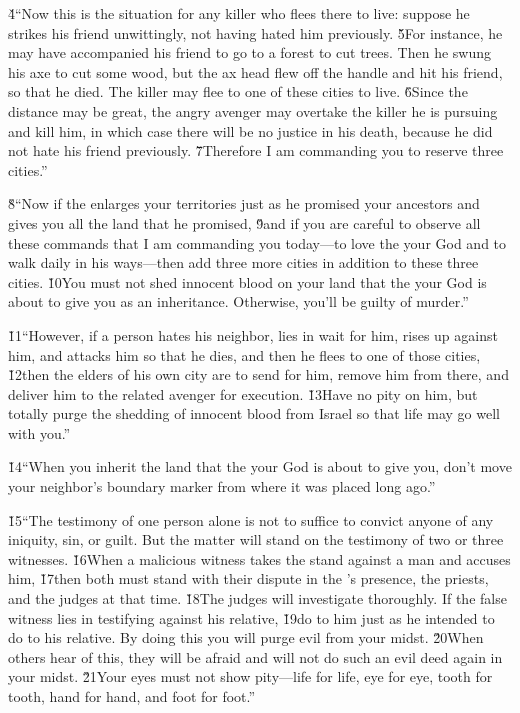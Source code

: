 \v{4}``Now this is the situation for any killer who flees there to live: suppose he strikes his friend unwittingly, not having hated him previously. \v{5}For instance, he may have accompanied his friend to go to a forest to cut trees. Then he swung his axe to cut some wood, but the ax head flew off the handle and hit his friend, so that he died. The killer may flee to one of these cities to live. \v{6}Since the distance may be great, the angry avenger may overtake the killer he is pursuing and kill him, in which case there will be no justice in his death, because he did not hate his friend previously. \v{7}Therefore I am commanding you to reserve three cities.''

\v{8}``Now if the  enlarges your territories just as he promised your ancestors and gives you all the land that he promised, \v{9}and if you are careful to observe all these commands that I am commanding you today---to love the  your God and to walk daily in his ways---then add three more cities in addition to these three cities. \v{10}You must not shed innocent blood on your land that the  your God is about to give you as an inheritance. Otherwise, you'll be guilty of murder.''

\v{11}``However, if a person hates his neighbor, lies in wait for him, rises up against him, and attacks him so that he dies, and then he flees to one of those cities, \v{12}then the elders of his own city are to send for him, remove him from there, and deliver him to the related avenger for execution. \v{13}Have no pity on him, but totally purge the shedding of innocent blood from Israel so that life may go well with you.''

\v{14}``When you inherit the land that the  your God is about to give you, don't move your neighbor's boundary marker from where it was placed long ago.''

\v{15}``The testimony of one person alone is not to suffice to convict anyone of any iniquity, sin, or guilt. But the matter will stand on the testimony of two or three witnesses. \v{16}When a malicious witness takes the stand against a man and accuses him, \v{17}then both must stand with their dispute in the 's presence, the priests, and the judges at that time. \v{18}The judges will investigate thoroughly. If the false witness lies in testifying against his relative, \v{19}do to him just as he intended to do to his relative. By doing this you will purge evil from your midst. \v{20}When others hear of this, they will be afraid and will not do such an evil deed again in your midst. \v{21}Your eyes must not show pity---life for life, eye for eye, tooth for tooth, hand for hand, and foot for foot.''

